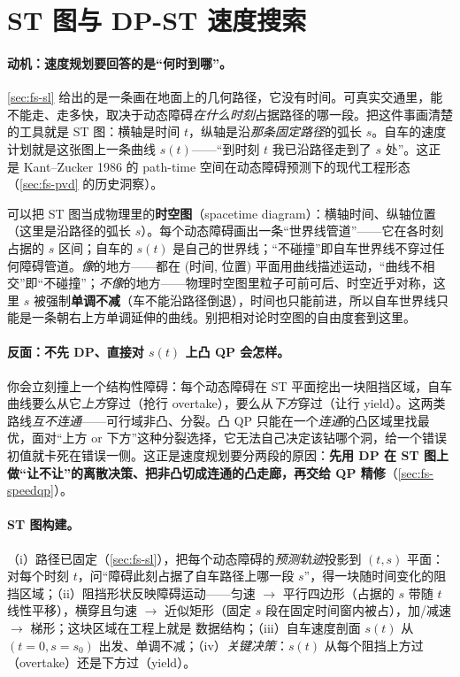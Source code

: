 \section{ST 图与 DP-ST 速度搜索}
\label{sec:fs-st}

\paragraph{动机：速度规划要回答的是“何时到哪”。}
\cref{sec:fs-sl} 给出的是一条画在地面上的几何路径，它没有时间。可真实交通里，能不能走、走多快，取决于动态障碍\emph{在什么时刻}占据路径的哪一段。把这件事画清楚的工具就是 ST 图：横轴是时间 $t$，纵轴是沿\emph{那条固定路径}的弧长 $s$。自车的速度计划就是这张图上一条曲线 $s(t)$——“到时刻 $t$ 我已沿路径走到了 $s$ 处”。这正是 Kant--Zucker 1986\cite{kant1986toward} 的 path-time 空间在动态障碍预测下的现代工程形态（\cref{sec:fs-pvd} 的历史洞察）。

\begin{insight}
可以把 ST 图当成物理里的\textbf{时空图}（spacetime diagram）：横轴时间、纵轴位置（这里是沿路径的弧长 $s$）。每个动态障碍画出一条“世界线管道”——它在各时刻占据的 $s$ 区间；自车的 $s(t)$ 是自己的世界线；“不碰撞”即自车世界线不穿过任何障碍管道。\emph{像}的地方——都在 (时间, 位置) 平面用曲线描述运动，“曲线不相交”即“不碰撞”；\emph{不像}的地方——物理时空图里粒子可前可后、时空近乎对称，这里 $s$ 被强制\textbf{单调不减}（车不能沿路径倒退），时间也只能前进，所以自车世界线只能是一条朝右上方单调延伸的曲线。别把相对论时空图的自由度套到这里。
\end{insight}

\paragraph{反面：不先 DP、直接对 $s(t)$ 上凸 QP 会怎样。}
你会立刻撞上一个结构性障碍：每个动态障碍在 ST 平面挖出一块阻挡区域，自车曲线要么从它\emph{上方}穿过（抢行 overtake），要么从\emph{下方}穿过（让行 yield）。这两类路线\emph{互不连通}——可行域非凸、分裂。凸 QP 只能在一个\emph{连通}的凸区域里找最优，面对“上方 or 下方”这种分裂选择，它无法自己决定该钻哪个洞，给一个错误初值就卡死在错误一侧。这正是速度规划要分两段的原因：\textbf{先用 DP 在 ST 图上做“让不让”的离散决策、把非凸切成连通的凸走廊，再交给 QP 精修}（\cref{sec:fs-speedqp}）。

\paragraph{ST 图构建。}
（i）路径已固定（\cref{sec:fs-sl}），把每个动态障碍的\emph{预测轨迹}投影到 $(t,s)$ 平面：对每个时刻 $t$，问“障碍此刻占据了自车路径上哪一段 $s$”，得一块随时间变化的阻挡区域；（ii）阻挡形状反映障碍运动——匀速 $\to$ 平行四边形（占据的 $s$ 带随 $t$ 线性平移），横穿且匀速 $\to$ 近似矩形（固定 $s$ 段在固定时间窗内被占），加/减速 $\to$ 梯形；这块区域在工程上就是 \verb@STBoundary@ 数据结构；（iii）自车速度剖面 $s(t)$ 从 $(t{=}0,s{=}s_0)$ 出发、单调不减；（iv）\emph{关键决策}：$s(t)$ 从每个阻挡上方过（overtake）还是下方过（yield）。

